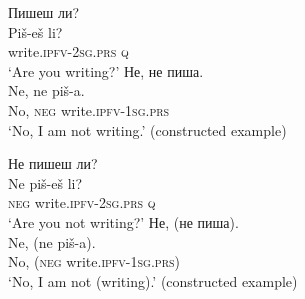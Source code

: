 \documentclass[output=paper,colorlinks=true, citecolor=brown]{langscibook}
\begin{document}
\ea\label{ex:bul:qn-1a}
    \begin{xlist}[B: ]
     Пишеш ли?\\
        \gll Piš-eš li? \\ 
             write.\textsc{ipfv}-\textsc{2sg.prs} \textsc{q} \\ 
        \glt `Are you writing?'
     Не, не пиша.\\
        \gll Ne, ne piš-a. \\ 
             No, \textsc{neg} write.\textsc{ipfv}-\textsc{1sg.prs} \\
        \glt `No, I am not writing.' (constructed example)
    \end{xlist}
\z 

\ea\label{ex:bul:qn-1b}
    \begin{xlist}[B: ]
     Не пишеш ли? \\
        \gll Ne piš-eš li? \\ 
             \textsc{neg} write.\textsc{ipfv}-\textsc{2sg.prs} \textsc{q} \\ 
        \glt `Are you not writing?'
     Не, (не пиша).\\
        \gll Ne, (ne piš-a). \\ 
             No, (\textsc{neg} write.\textsc{ipfv}-\textsc{1sg.prs}) \\
        \glt `No, I am not (writing).' (constructed example)
    \end{xlist}
\z 
\end{document}
